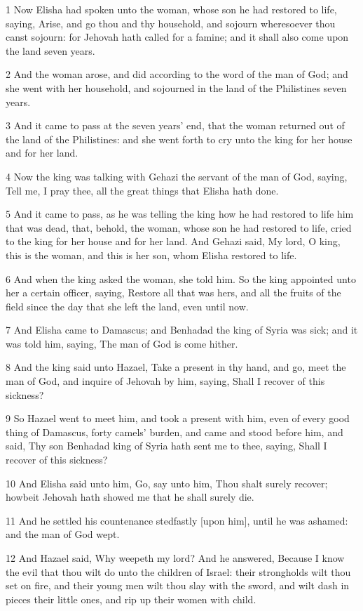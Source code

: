 \par 1 Now Elisha had spoken unto the woman, whose son he had restored to life, saying, Arise, and go thou and thy household, and sojourn wheresoever thou canst sojourn: for Jehovah hath called for a famine; and it shall also come upon the land seven years.
\par 2 And the woman arose, and did according to the word of the man of God; and she went with her household, and sojourned in the land of the Philistines seven years.
\par 3 And it came to pass at the seven years' end, that the woman returned out of the land of the Philistines: and she went forth to cry unto the king for her house and for her land.
\par 4 Now the king was talking with Gehazi the servant of the man of God, saying, Tell me, I pray thee, all the great things that Elisha hath done.
\par 5 And it came to pass, as he was telling the king how he had restored to life him that was dead, that, behold, the woman, whose son he had restored to life, cried to the king for her house and for her land. And Gehazi said, My lord, O king, this is the woman, and this is her son, whom Elisha restored to life.
\par 6 And when the king asked the woman, she told him. So the king appointed unto her a certain officer, saying, Restore all that was hers, and all the fruits of the field since the day that she left the land, even until now.
\par 7 And Elisha came to Damascus; and Benhadad the king of Syria was sick; and it was told him, saying, The man of God is come hither.
\par 8 And the king said unto Hazael, Take a present in thy hand, and go, meet the man of God, and inquire of Jehovah by him, saying, Shall I recover of this sickness?
\par 9 So Hazael went to meet him, and took a present with him, even of every good thing of Damascus, forty camels' burden, and came and stood before him, and said, Thy son Benhadad king of Syria hath sent me to thee, saying, Shall I recover of this sickness?
\par 10 And Elisha said unto him, Go, say unto him, Thou shalt surely recover; howbeit Jehovah hath showed me that he shall surely die.
\par 11 And he settled his countenance stedfastly [upon him], until he was ashamed: and the man of God wept.
\par 12 And Hazael said, Why weepeth my lord? And he answered, Because I know the evil that thou wilt do unto the children of Israel: their strongholds wilt thou set on fire, and their young men wilt thou slay with the sword, and wilt dash in pieces their little ones, and rip up their women with child.
